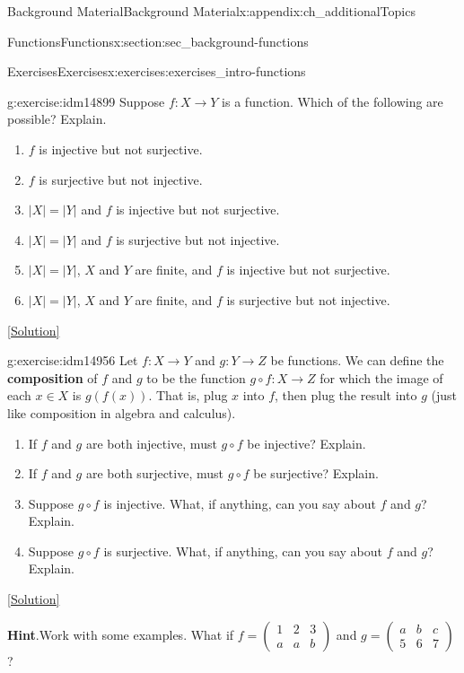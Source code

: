 \documentclass[oneside,10pt,]{book}
\newcommand{\terminology}[1]{\textbf{#1}}
\numberwithin{equation}{chapter}
\newcommand{\twoline}[2]{\begin{pmatrix}#1 \\ #2 \end{pmatrix}}
\newcommand{\amp}{&}
\begin{document}
\begin{appendixptx}{Background Material}{}{Background Material}{}{}{x:appendix:ch_additionalTopics}
\begin{sectionptx}{Functions}{}{Functions}{}{}{x:section:sec_background-functions}
\begin{exercises-subsection}{Exercises}{}{Exercises}{}{}{x:exercises:exercises_intro-functions}
\begin{divisionexercise}{12}{}{}{g:exercise:idm14899}%
Suppose \(f:X \to Y\) is a function. Which of the following are possible? Explain.%
\begin{enumerate}[label=(\alph*)]
\item{}\(f\) is injective but not surjective.%
\item{}\(f\) is surjective but not injective.%
\item{}\(|X| = |Y|\) and \(f\) is injective but not surjective.%
\item{}\(|X| = |Y|\) and \(f\) is surjective but not injective.%
\item{}\(|X| = |Y|\), \(X\) and \(Y\) are finite, and \(f\) is injective but not surjective.%
\item{}\(|X| = |Y|\), \(X\) and \(Y\) are finite, and \(f\) is surjective but not injective.%
\end{enumerate}
%
\space\hspace*{0pt}\hfill{\tiny\hyperlink{g:solution:idm14924-main}{[Solution]}}\end{divisionexercise}%
\begin{divisionexercise}{13}{}{}{g:exercise:idm14956}%
Let \(f:X \to Y\) and \(g:Y \to Z\) be functions.  We can define the \terminology{composition} of \(f\) and \(g\) to be the function \(g\circ f:X \to Z\) for which the image of each \(x \in X\) is \(g(f(x))\).  That is, plug \(x\) into \(f\), then plug the result into \(g\) (just like composition in algebra and calculus).%
\par
%
\begin{enumerate}[label=(\alph*)]
\item{}If \(f\) and \(g\) are both injective, must \(g\circ f\) be injective?  Explain.%
\item{}If \(f\) and \(g\) are both surjective, must \(g\circ f\) be surjective?  Explain.%
\item{}Suppose \(g\circ f\) is injective.  What, if anything, can you say about \(f\) and \(g\)?  Explain.%
\item{}Suppose \(g\circ f\) is surjective.  What, if anything, can you say about \(f\) and \(g\)?  Explain.%
\end{enumerate}
%
\space\hspace*{0pt}\hfill{\tiny\hyperlink{g:solution:idm14998-main}{[Solution]}}\par\smallskip%
\noindent\textbf{Hint}.\hypertarget{g:hint:idm14994}{}\quad{}Work with some examples.  What if \(f = \twoline{1\amp 2 \amp 3}{a \amp a \amp b}\) and \(g = \twoline{a\amp b \amp c}{5 \amp 6 \amp 7}\)?%

\end{divisionexercise}
\end{exercises-subsection}
\end{sectionptx}
\end{appendixptx}
\end{document}
